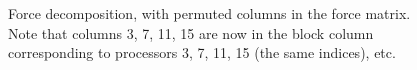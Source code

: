 \begin{figure}[htbp]
\begin{center}
\caption{Force decomposition, with permuted columns in the force matrix.
Note that columns 3, 7, 11, 15 are now in the block column corresponding to
processors 3, 7, 11, 15 (the same indices), etc.}
\label{fig:force-perm}
\end{center}
\end{figure}

